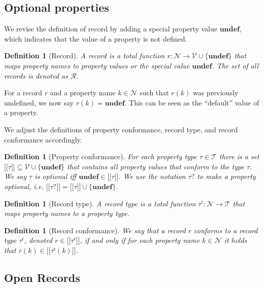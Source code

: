 \documentclass[a4paper]{article}
\newtheorem{definition}[theorem]{Definition}
\newcommand{\ptype}{\tau}
\newcommand{\ptypes}{\mathcal{T}}
\newcommand{\rtype}{\tau^\mathsf{r}}
\newcommand{\lsem}{\ensuremath{[\![}}
\newcommand{\rsem}{\ensuremath{]\!]}}
\newcommand{\sem}[1]{\ensuremath{\lsem #1 \rsem}}
\newcommand{\undefined}{\mathbf{undef}}
\begin{document}
\subsection{Optional properties}

We revise the definition of record by adding a special property value $\undefined$, which indicates that the value of a property is not defined.

\begin{definition}[Record]
  A \emph{record} is a total function $r : \mathcal{N} \to \mathcal{V} \cup \{\undefined\}$ that maps property names to property values or the special value $\undefined$. The set of all records is denoted as $\mathcal{R}$.
\end{definition}

For a record $r$ and a property name $k \in \mathcal{N}$ such that $r(k)$ was previously undefined, we now say $r(k) = \undefined$. This can be seen as the ``default'' value of a property.

We adjust the definitions of property conformance, record type, and record conformance accordingly.

\begin{definition}[Property conformance]
  For each property type $\ptype \in \ptypes$ there is a set $\sem{\ptype} \subseteq \mathcal{V} \cup \{\undefined\}$ that contains all property values that \emph{conform} to the type $\ptype$. We say $\ptype$ is \emph{optional} iff $\undefined \in \sem{\ptype}$. We use the notation $\ptype?$ to make a property optional, i.e. $\sem{\ptype?} = \sem{\ptype} \cup \{ \undefined \}$.
\end{definition}

\begin{definition}[Record type]
  A \emph{record type} is a total function $\rtype : \mathcal{N} \to \ptypes$ that maps property names to a property type.
\end{definition}

\begin{definition}[Record conformance]
  We say that a record $r$ \emph{conforms} to a record type $\rtype$, denoted $r \in \sem{\rtype}$, if and only if for each property name $k \in \mathcal{N}$ it holds that $r(k) \in \sem{\rtype(k)}$.
\end{definition}

\subsection{Open Records}
\end{document}
